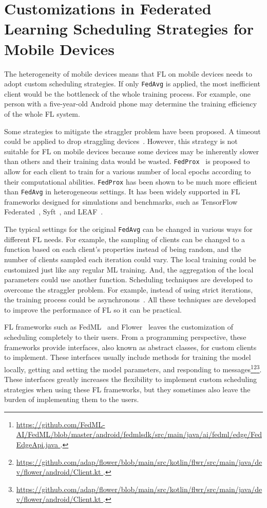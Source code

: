 \documentclass[conference]{IEEEtran}
\begin{document}
\section{Customizations in Federated Learning Scheduling Strategies for
    Mobile Devices
}

The heterogeneity of mobile devices means that FL on mobile devices needs to
adopt custom scheduling strategies.
If only \verb|FedAvg| is applied,
the most inefficient client would be the bottleneck of
the whole training process.
For example, one person with a five-year-old Android phone may determine
the training efficiency of the whole FL system.

Some strategies to mitigate the straggler problem have been proposed.
A timeout could be applied to drop
straggling devices~\cite{bonawitz2019towards}.
However, this strategy is not suitable for FL on mobile devices because
some devices may be inherently slower than others and
their training data would be wasted.
\verb|FedProx|~\cite{li2020federated} is proposed to
allow for each client to train for a various number of local epochs according to
their computational abilities.
\verb|FedProx| has been shown to be much more efficient than
\verb|FedAvg| in heterogeneous settings.
It has been widely supported in FL frameworks designed for simulations and
benchmarks, such as
TensorFlow Federated~\cite{tff},
Syft~\cite{ryffel2018generic,Ziller2021,hall2021syft}, and
LEAF~\cite{caldas2018leaf}.

The typical settings for the original \verb|FedAvg| can be changed in
various ways for different FL needs.
For example,
the sampling of clients can be changed to a function based on
each client's properties instead of being random,
and the number of clients sampled each iteration could vary.
The local training could be customized just like any regular ML training.
And, the aggregation of the local parameters could use another function.
Scheduling techniques are developed to overcome the straggler problem.
For example, instead of using strict iterations,
the training process could be
asynchronous~\cite{chilimbi2014project,zhu2022online}.
All these techniques are developed to improve the performance of FL
so it can be practical.

FL frameworks such as FedML~\cite{he2020fedml} and
Flower~\cite{beutel2020flower} leaves the customization of
scheduling completely to their users.
From a programming perspective,
these frameworks provide interfaces,
also known as abstract classes,
for custom clients to implement.
These interfaces usually include methods for
training the model locally,
getting and setting the model parameters,
and responding to messages\footnote{\url{
    https://github.com/FedML-AI/FedML/blob/master/android/fedmlsdk/src/main/java/ai/fedml/edge/FedEdgeApi.java
}.}\footnote{\url{
    https://github.com/adap/flower/blob/main/src/kotlin/flwr/src/main/java/dev/flower/android/Client.kt
}.}\footnote{\url{
    https://github.com/adap/flower/blob/main/src/kotlin/flwr/src/main/java/dev/flower/android/Client.kt
}.}.
These interfaces greatly increases the flexibility to
implement custom scheduling strategies when using these FL frameworks,
but they sometimes also leave the burden of implementing them to the users.
\end{document}
